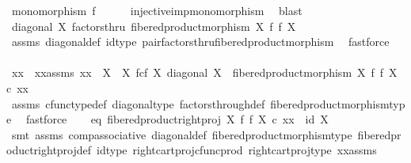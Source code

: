 \begin{isabellebody}
\ {\isachardoublequoteopen}monomorphism\ f{\isachardoublequoteclose}\isanewline
\ \ \ \ \isamarkupfalse%
\ injective{\isacharunderscore}{\kern0pt}imp{\isacharunderscore}{\kern0pt}monomorphism\ \isamarkupfalse%
\ blast\isanewline
{}\isamarkupfalse%
\isanewline
\ \ \isamarkupfalse%
\ {\isachardoublequoteopen}diagonal\ X\ factorsthru\ fibered{\isacharunderscore}{\kern0pt}product{\isacharunderscore}{\kern0pt}morphism\ X\ f\ f\ X{\isachardoublequoteclose}\isanewline
\ \ \ \ \isamarkupfalse%
\ assms{\isacharparenleft}{\kern0pt}{}{\isacharparenright}{\kern0pt}\ diagonal{\isacharunderscore}{\kern0pt}def\ id{\isacharunderscore}{\kern0pt}type\ pair{\isacharunderscore}{\kern0pt}factorsthru{\isacharunderscore}{\kern0pt}fibered{\isacharunderscore}{\kern0pt}product{\isacharunderscore}{\kern0pt}morphism\ \isamarkupfalse%
\ fastforce\isanewline
\ \ \isamarkupfalse%
\ \isamarkupfalse%
\ xx\ \ xx{\isacharunderscore}{\kern0pt}assms{\isacharcolon}{\kern0pt}\ {\isachardoublequoteopen}xx\ {\isacharcolon}{\kern0pt}\ X\ {\isasymrightarrow}\ X\ \isactrlbsub f\isactrlesub {\isasymtimes}\isactrlsub c\isactrlbsub f\isactrlesub \ X{\isachardoublequoteclose}\ {\isachardoublequoteopen}diagonal\ X\ {\isacharequal}{\kern0pt}\ fibered{\isacharunderscore}{\kern0pt}product{\isacharunderscore}{\kern0pt}morphism\ X\ f\ f\ X\ {\isasymcirc}\isactrlsub c\ xx{\isachardoublequoteclose}\isanewline
\ \ \ \ \isamarkupfalse%
\ assms{\isacharparenleft}{\kern0pt}{}{\isacharparenright}{\kern0pt}\ cfunc{\isacharunderscore}{\kern0pt}type{\isacharunderscore}{\kern0pt}def\ diagonal{\isacharunderscore}{\kern0pt}type\ factors{\isacharunderscore}{\kern0pt}through{\isacharunderscore}{\kern0pt}def\ fibered{\isacharunderscore}{\kern0pt}product{\isacharunderscore}{\kern0pt}morphism{\isacharunderscore}{\kern0pt}type\ \isamarkupfalse%
\ fastforce\isanewline
\ \ \isamarkupfalse%
\ eq{}{\isacharcolon}{\kern0pt}\ {\isachardoublequoteopen}fibered{\isacharunderscore}{\kern0pt}product{\isacharunderscore}{\kern0pt}right{\isacharunderscore}{\kern0pt}proj\ X\ f\ f\ X\ {\isasymcirc}\isactrlsub c\ xx\ {\isacharequal}{\kern0pt}\ id\ X{\isachardoublequoteclose}\isanewline
\ \ \ \ \isamarkupfalse%
\ {\isacharparenleft}{\kern0pt}smt\ assms{\isacharparenleft}{\kern0pt}{}{\isacharparenright}{\kern0pt}\ comp{\isacharunderscore}{\kern0pt}associative{}\ diagonal{\isacharunderscore}{\kern0pt}def\ fibered{\isacharunderscore}{\kern0pt}product{\isacharunderscore}{\kern0pt}morphism{\isacharunderscore}{\kern0pt}type\ fibered{\isacharunderscore}{\kern0pt}product{\isacharunderscore}{\kern0pt}right{\isacharunderscore}{\kern0pt}proj{\isacharunderscore}{\kern0pt}def\ id{\isacharunderscore}{\kern0pt}type\ right{\isacharunderscore}{\kern0pt}cart{\isacharunderscore}{\kern0pt}proj{\isacharunderscore}{\kern0pt}cfunc{\isacharunderscore}{\kern0pt}prod\ right{\isacharunderscore}{\kern0pt}cart{\isacharunderscore}{\kern0pt}proj{\isacharunderscore}{\kern0pt}type\ xx{\isacharunderscore}{\kern0pt}assms{\isacharparenright}{\kern0pt}\isanewline

\end{isabellebody}
